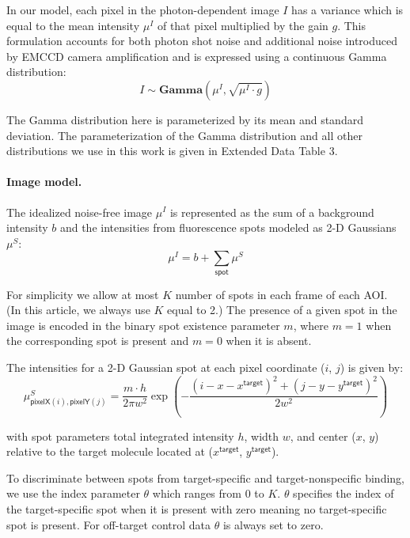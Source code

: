 In our model, each pixel in the photon-dependent image $I$ has a  variance which is equal to  the mean intensity $\mu^I$ of that pixel multiplied by the gain $g$. This formulation accounts for both photon shot noise and additional noise introduced by EMCCD camera amplification \cite{Van_Vliet1998-jk} and is expressed using a continuous Gamma distribution:
%
\begin{equation}
    I \sim \mathbf{Gamma} (\mu^I, \sqrt{\mu^I \cdot g})
\end{equation}

The Gamma distribution here is parameterized by its mean and standard deviation. The parameterization of the Gamma distribution and all other distributions we use in this work is given in Extended Data Table 3.

\paragraph{Image model.} The idealized noise-free image $\mu^I$ is represented  as the sum of a background intensity $b$ and the intensities from fluorescence spots modeled as  2-D Gaussians $\mu^S$:
%
\begin{equation}
    \mu^I = b + \sum_{\mathsf{spot}} \mu^S
\end{equation}

\noindent
For simplicity we allow at most $K$ number of spots in each frame of each AOI.  (In this article, we always use $K$ equal to 2.)  The presence of a given spot in the image is encoded in the binary spot existence parameter $m$, where $m = 1$ when the corresponding spot is present and $m = 0$ when it is absent.

The intensities for a 2-D Gaussian spot at each pixel coordinate ($i$, $j$) is given by:
%
\begin{equation}
    \mu^S_{\mathsf{pixelX}(i), \mathsf{pixelY}(j)} = \dfrac{m \cdot h}{2 \pi w^2} \exp{\left( -\dfrac{(i-x-x^\mathsf{target})^2 + (j-y-y^\mathsf{target})^2}{2 w^2} \right)}
\end{equation}

\noindent
with spot parameters total integrated intensity $h$, width $w$, and center ($x$, $y$) relative to the target molecule located at ($x^\mathsf{target}$, $y^\mathsf{target}$). 
%

To discriminate between spots from target-specific and target-nonspecific binding, we use the index parameter $\theta$ which ranges from $0$ to $K$. $\theta$ specifies the index of the target-specific spot when it is present with zero meaning no target-specific spot is present. For off-target control data $\theta$ is always set to zero.
%

